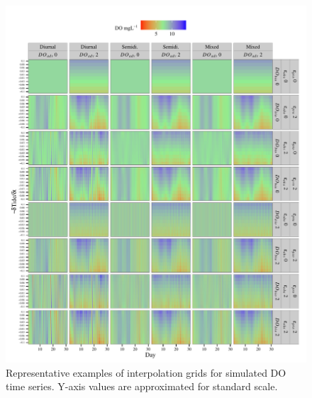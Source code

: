 \documentclass{article}\usepackage{graphicx, color}
\makeatletter
\def\maxwidth{ %
  \ifdim\Gin@nat@width>\linewidth
    \linewidth
  \else
    \Gin@nat@width
  \fi
}
\newenvironment{knitrout}{}{} %
\makeatother
\begin{document}
\begin{knitrout}
\color{fgcolor}\begin{figure}[!h]


{\centering \includegraphics[width=\maxwidth]{figure/cont_ex} 

}

\caption[Representative examples of interpolation grids for simulated DO time series]{Representative examples of interpolation grids for simulated DO time series.  Y-axis values are approximated for standard scale.\label{fig:cont_ex}}
\end{figure}


\end{knitrout}

\clearpage

\end{document}
